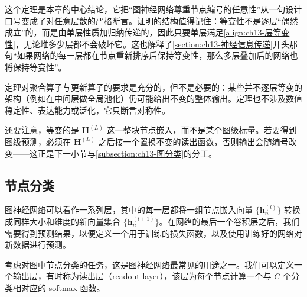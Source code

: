 \documentclass[../../main.tex]{subfiles}
\begin{document}
\begin{remark}
这个定理是本章的中心结论，它把“图神经网络尊重节点编号的任意性”从一句设计口号变成了对任意层数的严格断言。证明的结构值得记住：等变性不是逐层“偶然成立”的，而是由单层性质加归纳传递的，因此只要单层满足\eqref{align:ch13-层等变性}，无论堆多少层都不会破坏它。这也解释了\cref{section:ch13-神经信息传递}开头那句“如果网络的每一层都在节点重新排序后保持等变性，那么多层叠加后的网络也将保持等变性”。\par
定理对聚合算子与更新算子的要求是充分的，但不是必要的：某些并不逐层等变的架构（例如在中间层做全局池化）仍可能给出不变的整体输出。定理也不涉及数值稳定性、表达能力或泛化，它只断言对称性。\par
还要注意，等变的是 $\bm{H}^{(L)}$ 这一整块节点嵌入，而不是某个图级标量。若要得到图级预测，必须在 $\bm{H}^{(L)}$ 之后接一个置换不变的读出函数，否则输出会随编号改变——这正是下一小节与\cref{subsection:ch13-图分类}的分工。
\end{remark}

\subsection{节点分类}\label{subsection:ch13-节点分类}

图神经网络可以看作一系列层，其中的每一层都将一组节点嵌入向量 $\{\bm{h}_n^{(l)}\}$ 转换成同样大小和维度的新向量集合 $\{\bm{h}_n^{(l+1)}\}$。在网络的最后一个卷积层之后，我们需要得到预测结果，以便定义一个用于训练的损失函数，以及使用训练好的网络对新数据进行预测。

考虑对图中节点分类的任务，这是图神经网络最常见的用途之一。我们可以定义一个输出层，有时称为读出层（readout layer），该层为每个节点计算一个与 $C$ 个分类相对应的 softmax 函数。
\end{document}
